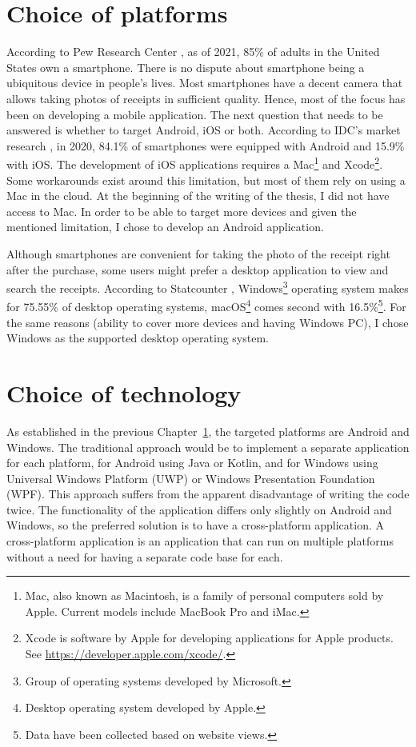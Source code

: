 \documentclass[
  printed, %
  table,   %
  oneside, %
  lof,     %
  lot,     %
]{fithesis3}
\begin{document}
\chapter{Choice of platforms}
\label{chap:choice_of_platforms}
According to Pew Research Center \cite{PewResearchCenter2021Mobile}, as of 2021, 85\% of adults in the United States own a smartphone. There is no dispute about smartphone being a ubiquitous device in people's lives. 
Most smartphones have a decent camera that allows taking photos of receipts in sufficient quality. Hence, most of the focus has been on developing a mobile application.
The next question that needs to be answered is whether to target Android, iOS or both. According to IDC's market research \cite{Idc2021Smartphone}, in 2020, 84.1\% of smartphones were equipped with Android and 15.9\% with iOS. The development of iOS applications requires a Mac\footnote{Mac, also known as Macintosh, is a family of personal computers sold by Apple. Current models include MacBook Pro and iMac.} and Xcode\footnote{Xcode is software by Apple for developing applications for Apple products.\\See \url{https://developer.apple.com/xcode/}.}. Some workarounds exist around this limitation, but most of them rely on using a Mac in the cloud. At the beginning of the writing of the thesis, I did not have access to Mac. In order to be able to target more devices and given the mentioned limitation, I chose to develop an Android application.

Although smartphones are convenient for taking the photo of the receipt right after the purchase, some users might prefer a desktop application to view and search the receipts.
According to Statcounter \cite{Statcounter2021Desktop}, Windows\footnote{Group of operating systems developed by Microsoft.} operating system makes for 75.55\% of desktop operating systems, macOS\footnote{Desktop operating system developed by Apple.} comes second with 16.5\%\footnote{Data have been collected based on website views.}.
For the same reasons (ability to cover more devices and having Windows PC), I chose Windows as the supported desktop operating system.

\chapter{Choice of technology}
As established in the previous Chapter~\ref{chap:choice_of_platforms}, the targeted platforms are Android and Windows. The traditional approach would be to implement a separate application for each platform, for Android using Java or Kotlin, and for Windows using Universal Windows Platform (UWP) or Windows Presentation Foundation (WPF). This approach suffers from the apparent disadvantage of writing the code twice. The functionality of the application differs only slightly on Android and Windows, so the preferred solution is to have a cross-platform application. A cross-platform application is an application that can run on multiple platforms without a need for having a separate code base for each.
\end{document}
